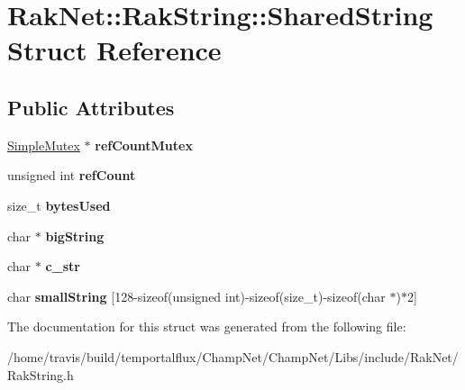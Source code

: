 \hypertarget{struct_rak_net_1_1_rak_string_1_1_shared_string}{\section{Rak\-Net\-:\-:Rak\-String\-:\-:Shared\-String Struct Reference}
\label{struct_rak_net_1_1_rak_string_1_1_shared_string}
}
\subsection*{Public Attributes}
\begin{DoxyCompactItemize}
\item 
\hypertarget{struct_rak_net_1_1_rak_string_1_1_shared_string_ab00ea0a601aa0282f467578cb15494d9}{\hyperlink{class_rak_net_1_1_simple_mutex}{Simple\-Mutex} $\ast$ {\bfseries ref\-Count\-Mutex}}\label{struct_rak_net_1_1_rak_string_1_1_shared_string_ab00ea0a601aa0282f467578cb15494d9}

\item 
\hypertarget{struct_rak_net_1_1_rak_string_1_1_shared_string_a2569b8970c238b6ec4b2bf450f8565ae}{unsigned int {\bfseries ref\-Count}}\label{struct_rak_net_1_1_rak_string_1_1_shared_string_a2569b8970c238b6ec4b2bf450f8565ae}

\item 
\hypertarget{struct_rak_net_1_1_rak_string_1_1_shared_string_a20dac61d6d5fdd666f14b4f0d40c397f}{size\-\_\-t {\bfseries bytes\-Used}}\label{struct_rak_net_1_1_rak_string_1_1_shared_string_a20dac61d6d5fdd666f14b4f0d40c397f}

\item 
\hypertarget{struct_rak_net_1_1_rak_string_1_1_shared_string_acf34823c5f344d9a9b9cec7830a90adf}{char $\ast$ {\bfseries big\-String}}\label{struct_rak_net_1_1_rak_string_1_1_shared_string_acf34823c5f344d9a9b9cec7830a90adf}

\item 
\hypertarget{struct_rak_net_1_1_rak_string_1_1_shared_string_a1702e35137add80b2cbceed427685d14}{char $\ast$ {\bfseries c\-\_\-str}}\label{struct_rak_net_1_1_rak_string_1_1_shared_string_a1702e35137add80b2cbceed427685d14}

\item 
\hypertarget{struct_rak_net_1_1_rak_string_1_1_shared_string_a2942cc2c6f580cd31efc54870e2d78e0}{char {\bfseries small\-String} \mbox{[}128-\/sizeof(unsigned int)-\/sizeof(size\-\_\-t)-\/sizeof(char $\ast$)$\ast$2\mbox{]}}\label{struct_rak_net_1_1_rak_string_1_1_shared_string_a2942cc2c6f580cd31efc54870e2d78e0}

\end{DoxyCompactItemize}


The documentation for this struct was generated from the following file\-:\begin{DoxyCompactItemize}
\item 
/home/travis/build/temportalflux/\-Champ\-Net/\-Champ\-Net/\-Libs/include/\-Rak\-Net/Rak\-String.\-h\end{DoxyCompactItemize}

